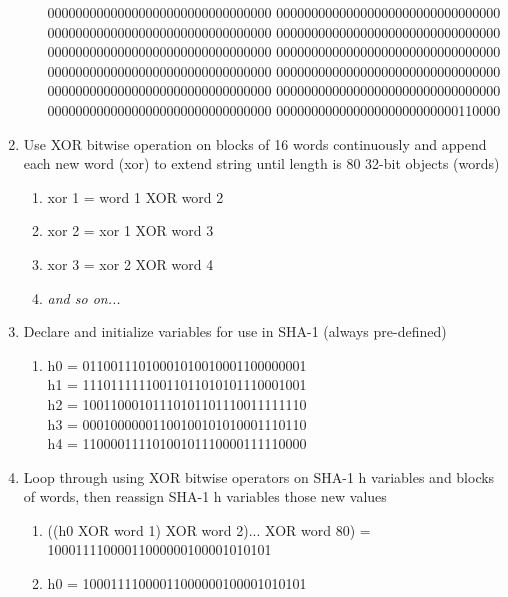 \documentclass[12pt]{extarticle}
\begin{document}
\begin{enumerate}
\begin{enumerate}
        00000000000000000000000000000000 00000000000000000000000000000000\\
        00000000000000000000000000000000 00000000000000000000000000000000\\
        00000000000000000000000000000000 00000000000000000000000000000000\\
        00000000000000000000000000000000 00000000000000000000000000000000\\
        00000000000000000000000000000000 00000000000000000000000000000000\\
        00000000000000000000000000000000 00000000000000000000000000110000
    \end{enumerate}
  \item Use XOR bitwise operation on blocks of 16 words continuously and append each new word (xor) to extend string until length is 80 32-bit objects (words)
       \begin{enumerate}
        \item xor 1 = word 1 XOR word 2
        \item xor 2 = xor 1 XOR word 3
        \item xor 3 = xor 2 XOR word 4
        \item {\slshape{and so on...}}
    \end{enumerate}
  \item Declare and initialize variables for use in SHA-1 (always pre-defined)
      \begin{enumerate}
        \item   h0 = 01100111010001010010001100000001\\
                h1 = 11101111110011011010101110001001\\
                h2 = 10011000101110101101110011111110\\
                h3 = 00010000001100100101010001110110\\
                h4 = 11000011110100101110000111110000\\
    \end{enumerate}
  \item Loop through using XOR bitwise operators on SHA-1 h variables and blocks of words, then reassign SHA-1 h variables those new values
      \begin{enumerate}
        \item   ((h0 XOR word 1) XOR word 2)... XOR word 80) = 10001111000011000000100001010101
        \item   h0 = 10001111000011000000100001010101\\

\end{enumerate}
\end{enumerate}
\end{document}
